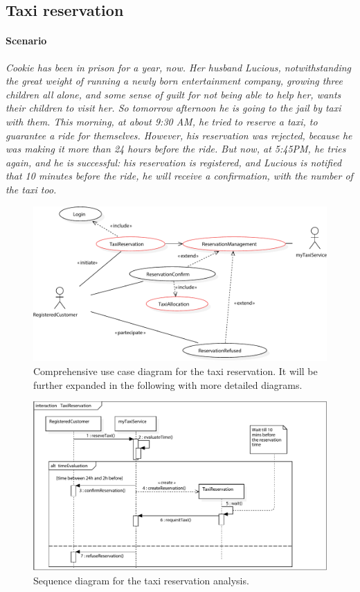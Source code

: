 \subsection{Taxi reservation}%


\paragraph{Scenario}{\small\itshape Cookie has been in prison for a year, now. Her husband Lucious, notwithstanding the great weight of running a newly born entertainment company, growing three children all alone, and some sense of guilt for not being able to help her, wants their children to visit her. So tomorrow afternoon he is going to the jail by taxi with them. This morning, at about 9:30 AM, he tried to reserve a taxi, to guarantee a ride for themselves. However, his reservation was rejected, because he was making it more than \num{24} hours before the ride. But now, at 5:45PM, he tries again, and he is successful: his reservation is registered, and Lucious is notified that \num{10} minutes before the ride, he will receive a confirmation, with the number of the taxi too.}


\begin{figure}%
	\centering%
	\includegraphics[width=\textwidth]{img/U_TaxiReservationGLOBAL}%
	\caption{Comprehensive use case diagram for the taxi reservation. It will be further expanded in the following with more detailed diagrams.}%
\end{figure}


\begin{figure}%
	\includegraphics[width=\textwidth]{img/S_TaxiReservation}%
	\caption{Sequence diagram for the taxi reservation analysis.}%
\end{figure}	


